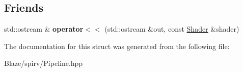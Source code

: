 \subsection*{Friends}
\begin{DoxyCompactItemize}
\item 
\mbox{\label{structblaze_1_1spirv_1_1Shader_a7cd5e76e0aadd59a743317d722b404db}} 
std\+::ostream \& {\bfseries operator$<$$<$} (std\+::ostream \&out, const \hyperlink{structblaze_1_1spirv_1_1Shader}{Shader} \&shader)
\end{DoxyCompactItemize}


The documentation for this struct was generated from the following file\+:\begin{DoxyCompactItemize}
\item 
Blaze/spirv/Pipeline.\+hpp\end{DoxyCompactItemize}
